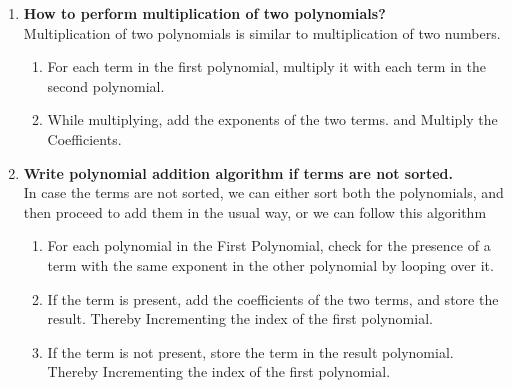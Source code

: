\documentclass[11pt]{article}
\begin{document}
\begin{enumerate}
\begin{lstlisting}[language=C]
	\end{lstlisting}

	\item \textbf {How to perform multiplication of two polynomials?}\\

	      Multiplication of two polynomials is similar to multiplication of two numbers.
	      \begin{enumerate}
		      \item For each term in the first polynomial, multiply it with each term in the second polynomial.
		      \item While multiplying, add the exponents of the two terms. and Multiply the Coefficients.
	      \end{enumerate}

	\item \textbf { Write polynomial addition algorithm if terms are not sorted.}\\

	      In case the terms are not sorted, we can either sort both the polynomials, and then proceed to add them in the usual way, or we can follow this algorithm

	      \begin{enumerate}
		      \item For each polynomial in the First Polynomial, check for the presence of a term with the same exponent in the other polynomial by looping over it.
		      \item If the term is present, add the coefficients of the two terms, and store the result. Thereby Incrementing the index of the first polynomial.
		      \item If the term is not present, store the term in the result polynomial. Thereby Incrementing the index of the first polynomial.
	      \end{enumerate}

\end{enumerate}
\end{document}
